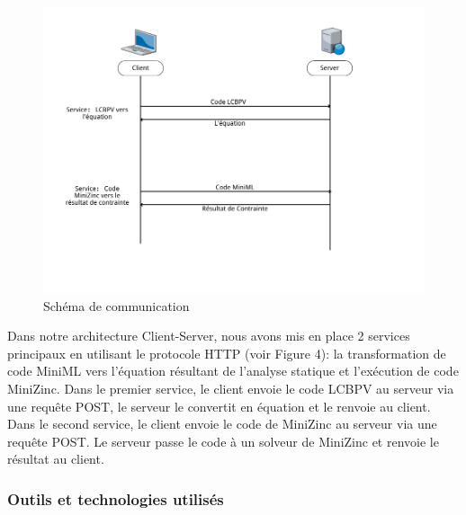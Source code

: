 \documentclass[
  12pt,
]{article}
\begin{document}
\begin{figure}
  \centering
  \includegraphics{Figures/Communication.png}
  \caption{Schéma de communication}
\end{figure}

\newpage

Dans notre architecture Client-Server, nous avons mis en place 2
services principaux en utilisant le protocole HTTP (voir Figure 4): la
transformation de code MiniML vers l'équation résultant de l'analyse
statique et l'exécution de code MiniZinc. Dans le premier service, le
client envoie le code LCBPV au serveur via une requête POST, le serveur
le convertit en équation et le renvoie au client. Dans le second
service, le client envoie le code de MiniZinc au serveur via une requête
POST. Le serveur passe le code à un solveur de MiniZinc et renvoie le
résultat au client.

\hypertarget{outils-et-technologies-utilisuxe9s-1}{%
  \subsubsection{Outils et technologies
    utilisés}\label{outils-et-technologies-utilisuxe9s-1}}
\end{document}
